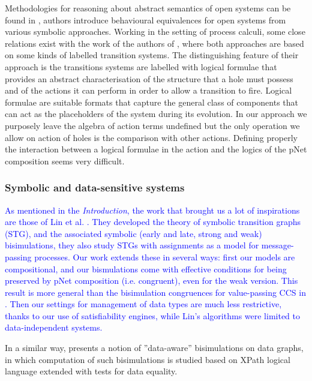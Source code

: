 \documentclass{lmcs}
\newcommand{\ERIC}[1]{\textcolor{blue}{#1}}
\begin{document}
Methodologies for reasoning about abstract semantics of open systems can be found in \cite{BaldanBB:2002, BaldanBB:07,Dubut:20}, authors introduce  behavioural equivalences for open systems from various symbolic approaches. Working in the setting of process calculi, some close relations  exist with the work  of the authors of \cite{BaldanBB:2002,BaldanBB:07}, where both approaches are based
on some kinds of labelled transition systems. The distinguishing feature of their approach is the transitions systems are labelled with logical formulae that provides  an abstract characterisation of the structure that a hole must possess and of the actions it can perform in order to allow a transition to fire. Logical formulae are suitable formats that capture the general class of components that can act as the placeholders of the system during its evolution. In our approach we purposely leave the algebra of action terms undefined but the only operation we allow on action of holes is the comparison with other actions. Defining properly the interaction between a logical formulae in the action and the logics of the pNet composition seems very difficult.

\subsubsection*{Symbolic and data-sensitive systems}
\ERIC{ As mentioned in the \emph{Introduction}, the work that brought us a lot of inspirations are those of Lin et al. \cite{IngolfsdottirL:2001,HennessyLin:TCS95,Linconcur96}. They developed the theory of symbolic transition graphs (STG), and the associated symbolic (early and late, strong and weak) bisimulations, they also study STGs with assignments as a model for message-passing processes. Our work extends these in several ways: first our models are compositional, and our bismulations come with effective conditions for being preserved by pNet composition (i.e. congruent), even for the weak version. This result is more general than the bisimulation congruences for value-passing CCS in \cite{IngolfsdottirL:2001}. Then our settings for management of data types are much less restrictive, thanks to our use of satisfiability engines, while Lin's algorithms were limited to data-independent systems. }

In a similar way, \cite{Abriola:2018} presents a notion of ''data-aware'' bisimulations on data graphs, in which computation of such bisimulations is studied based on XPath logical language extended with tests for data equality.
\end{document}
